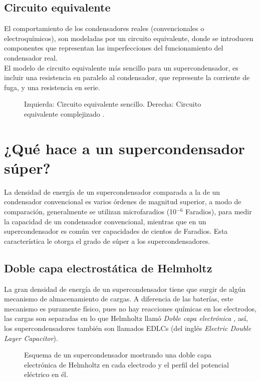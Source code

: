 \subsection{Circuito equivalente}
El comportamiento de los condensadores reales (convencionales o electroquímicos), son modeladas por un circuito equivalente, donde se introducen componentes que representan las imperfecciones del funcionamiento del condensador real.\\
El modelo de circuito equivalente más sencillo para un supercondensador, es incluir una resistencia en paralelo al condensador, que represente la corriente de fuga, y una resistencia en serie.

\begin{figure}
	\centering
	\caption{Izquierda: Circuito equivalente sencillo. Derecha: Circuito equivalente complejizado \citep{Fletcher2014}.}
	\label{fig:equiv_both}
\end{figure}

\section{¿Qué hace a un supercondensador súper?}
La densidad de energía de un supercondensador comparada a la de un condensador convencional es varios órdenes de magnitud superior, a modo de comparación, generalmente se utilizan microfaradios (10$^{-6}$ Faradios), para medir la capacidad de un condensador convencional, mientras que en un supercondensador es común ver capacidades de cientos de Faradios. Esta característica le otorga el grado de súper a los supercondensadores.

\subsection{Doble capa electrostática de Helmholtz}
La gran densidad de energía de un supercondensador tiene que surgir de algún mecanismo de almacenamiento de cargas. A diferencia de las baterías, este mecanismo es puramente físico, pues no hay reacciones químicas en los electrodos, las cargas son separadas en lo que Helmholtz llamó \emph{Doble capa electrónica} \citep{Frackowiak2001}, así, los supercondensadores también son llamados EDLCs (del inglés \emph{Electric Double Layer Capacitor}).

\begin{figure}[h!]
	\centering
	\caption{Esquema de un supercondensador mostrando una doble capa electrónica de Helmholtz en cada electrodo y el perfil del potencial eléctrico en él.}
	\label{fig:edlc}
\end{figure}

